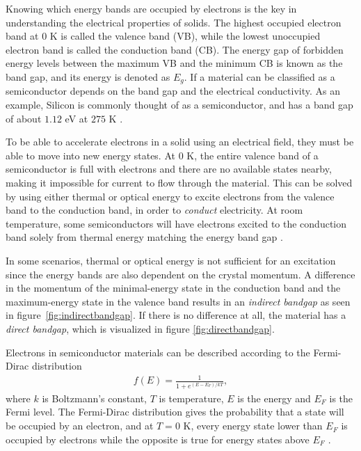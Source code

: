 Knowing which energy bands are occupied by electrons is the key in understanding the electrical properties of solids. The highest occupied electron band at $0$ K is called the valence band (VB), while the lowest unoccupied electron band is called the conduction band (CB). The energy gap of forbidden energy levels between the maximum VB and the minimum CB is known as the band gap, and its energy is denoted as $E_g$. If a material can be classified as a semiconductor depends on the band gap and the electrical conductivity. As an example, Silicon is commonly thought of as a semiconductor, and has a band gap of about $1.12$ eV at $275$ K \cite{Martienssen2005}.



To be able to accelerate electrons in a solid using an electrical field, they must be able to move into new energy states. At $0$ K, the entire valence band of a semiconductor is full with electrons and there are no available states nearby, making it impossible for current to flow through the material. This can be solved by using either thermal or optical energy to excite electrons from the valence band to the conduction band, in order to \textit{conduct} electricity. At room temperature, some semiconductors will have electrons excited to the conduction band solely from thermal energy matching the energy band gap \cite{BenStreetman2015}.

In some scenarios, thermal or optical energy is not sufficient for an excitation since the energy bands are also dependent on the crystal momentum. A difference in the momentum of the minimal-energy state in the conduction band and the maximum-energy state in the valence band results in an \textit{indirect bandgap} as seen in figure \ref{fig:indirectbandgap}. If there is no difference at all, the material has a \textit{direct bandgap}, which is visualized in figure \ref{fig:directbandgap}.

Electrons in semiconductor materials can be described according to the Fermi-Dirac distribution
\begin{align*}
  f(E) = \frac{1}{1+e^{(E-E_F)/kT}},
\end{align*}
where $k$ is Boltzmann's constant, $T$ is temperature, $E$ is the energy and $E_F$ is the Fermi level. The Fermi-Dirac distribution gives the probability that a state will be occupied by an electron, and at $T=0$ K, every energy state lower than $E_F$ is occupied by electrons while the opposite is true for energy states above $E_F$ \cite{BenStreetman2015}.

